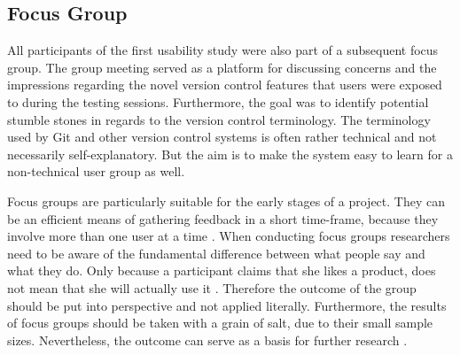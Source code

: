 






\subsection{Focus Group}
All participants of the first usability study were also part of a subsequent focus group. The group meeting served as a platform for discussing concerns and the impressions regarding the novel version control features that users were exposed to during the testing sessions. Furthermore, the goal was to identify potential stumble stones in regards to the version control terminology. The terminology used by Git and other version control systems is often rather technical and not necessarily self-explanatory. But the aim is to make the system easy to learn for a non-technical user group as well.

Focus groups are particularly suitable for the early stages of a project. They can be an efficient means of gathering feedback in a short time-frame, because they involve more than one user at a time \cite{rubin_handbook_2008,goodman_observing_2012}. When conducting focus groups researchers need to be aware of the fundamental difference between what people say and what they do. Only because a participant claims that she likes a product, does not mean that she will actually use it \cite{goodman_observing_2012}. Therefore the outcome of the group should be put into perspective and not applied literally. Furthermore, the results of focus groups should be taken with a grain of salt, due to their small sample sizes. Nevertheless, the outcome can serve as a basis for further research \cite{goodman_observing_2012}.

